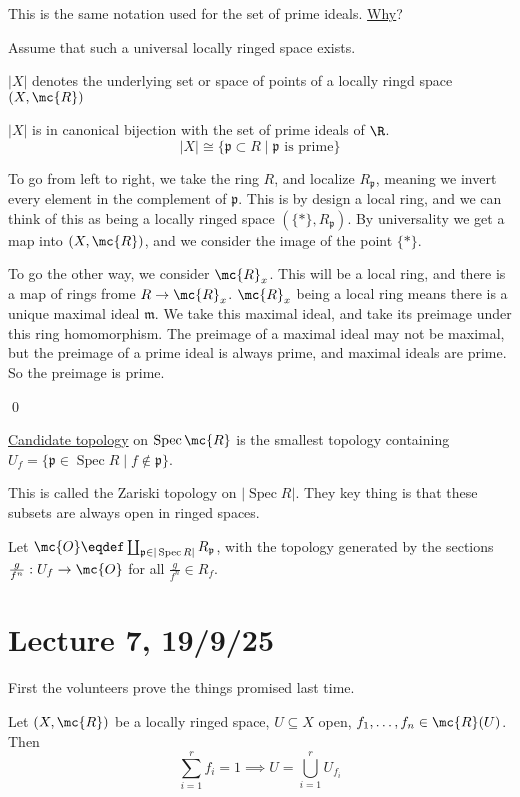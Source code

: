 \documentclass[x11names,reqno,14pt]{extarticle}
\newcommand{\mk}[1]{\mathfrak{#1}}
\DeclareMathOperator{\Spec}{Spec}
\begin{document}
This is the same notation used for the set of prime ideals. \underline{Why}?

Assume that such a universal locally ringed space exists. 

$|X|$ denotes the underlying set or space of points of a locally ringd space $(X,\mc{R})$

\claim

$|X|$ is in canonical bijection with the set of prime ideals of $\R$.
\[
|X| \cong \{\mk{p} \subset R \mid \mk{p}\text{ is prime} \}
\]

\proof

To go from left to right, we take the ring $R$, and localize $R_{\mk{p}}$, meaning we invert every element in the complement of $\mk{p}$. This is by design a local ring, and we can think of this as being a locally ringed space $(\{*\}, R_{\mk{p}})$. By universality we get a map into $(X,\mc{R})$, and we consider the image of the point $\{*\}$. 

To go the other way, we consider $\mc{R}_x$. This will be a local ring, and there is a map of rings frome $R \to \mc{R}_x$. $\mc{R}_x$ being a local ring means there is a unique maximal ideal $\mk{m}$. We take this maximal ideal, and take its preimage under this ring homomorphism. The preimage of a maximal ideal may not be maximal, but the preimage of a prime ideal is always prime, and maximal ideals are prime. So the preimage is prime.

\qed

\underline{Candidate topology} on $\Spec \mc{R}$ is the smallest topology containing $U_f = \{ \mk{p} \in \Spec R \mid f \not\in\mk{p}\}$. 

This is called the Zariski topology on $|\Spec R|$. They key thing is that these subsets are always open in ringed spaces. 
 
\defn[Structure Sheaf $\mc{O}$ on $|\Spec R|$]

Let $\mc{O} \eqdef \coprod_{\mk{p}\in|\Spec R|}R_{\mk{p}}$, with the topology generated by the sections $\frac{g}{f^n}:U_f \to \mc{O}$ for all $\frac{g}{f^n} \in R_f$.

\section*{Lecture 7, 19/9/25}

First the volunteers prove the things promised last time. 

\claim 

Let $(X,\mc{R})$ be a locally ringed space, $U \subseteq X$ open, $f_1, \dots, f_n \in \mc{R}(U)$. Then
\[
\sum_{i=1}^r f_i = 1 \implies U = \bigcup_{i=1}^r U_{f_i}
\]
\end{document}
